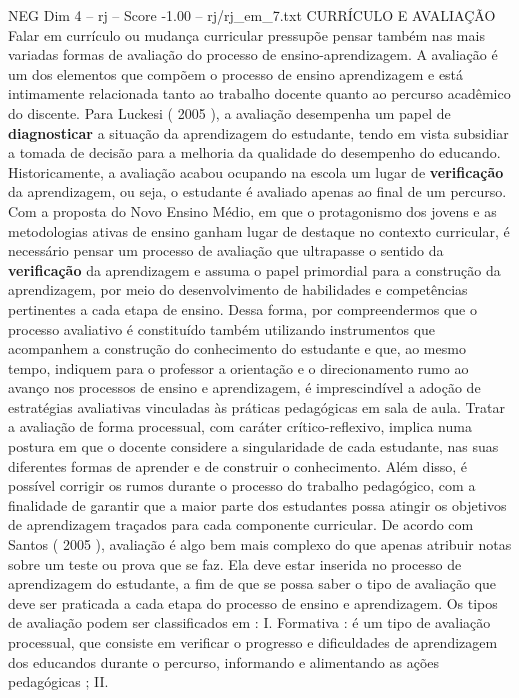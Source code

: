 \begin{textsample}{NEG Dim 4 – rj – Score -1.00 – rj/rj\_em\_7.txt}  \label{ex:f4_neg_125}
CURRÍCULO E AVALIAÇÃO Falar em currículo ou mudança curricular pressupõe pensar também nas mais variadas formas de avaliação do processo de ensino-aprendizagem.
A avaliação é um dos elementos que compõem o processo de ensino aprendizagem e está intimamente relacionada tanto ao trabalho docente quanto ao percurso acadêmico do discente.
Para Luckesi ( 2005 ), a avaliação desempenha um papel de \textbf{diagnosticar} a situação da aprendizagem do estudante, tendo em vista subsidiar a tomada de decisão para a melhoria da qualidade do desempenho do educando.
Historicamente, a avaliação acabou ocupando na escola um lugar de \textbf{verificação} da aprendizagem, ou seja, o estudante é avaliado apenas ao final de um percurso.
Com a proposta do Novo Ensino Médio, em que o protagonismo dos jovens e as metodologias ativas de ensino ganham lugar de destaque no contexto curricular, é necessário pensar um processo de avaliação que ultrapasse o sentido da \textbf{verificação} da aprendizagem e assuma o papel primordial para a construção da aprendizagem, por meio do desenvolvimento de habilidades e competências pertinentes a cada etapa de ensino.
Dessa forma, por compreendermos que o processo avaliativo é constituído também utilizando instrumentos que acompanhem a construção do conhecimento do estudante e que, ao mesmo tempo, indiquem para o professor a orientação e o direcionamento rumo ao avanço nos processos de ensino e aprendizagem, é imprescindível a adoção de estratégias avaliativas vinculadas às práticas pedagógicas em sala de aula.
Tratar a avaliação de forma processual, com caráter crítico-reflexivo, implica numa postura em que o docente considere a singularidade de cada estudante, nas suas diferentes formas de aprender e de construir o conhecimento.
Além disso, é possível corrigir os rumos durante o processo do trabalho pedagógico, com a finalidade de garantir que a maior parte dos estudantes possa atingir os objetivos de aprendizagem traçados para cada componente curricular.
De acordo com Santos ( 2005 ), avaliação é algo bem mais complexo do que apenas atribuir notas sobre um teste ou prova que se faz.
Ela deve estar inserida no processo de aprendizagem do estudante, a fim de que se possa saber o tipo de avaliação que deve ser praticada a cada etapa do processo de ensino e aprendizagem.
Os tipos de avaliação podem ser classificados em : I.
Formativa : é um tipo de avaliação processual, que consiste em verificar o progresso e dificuldades de aprendizagem dos educandos durante o percurso, informando e alimentando as ações pedagógicas ; II.

\end{textsample}
